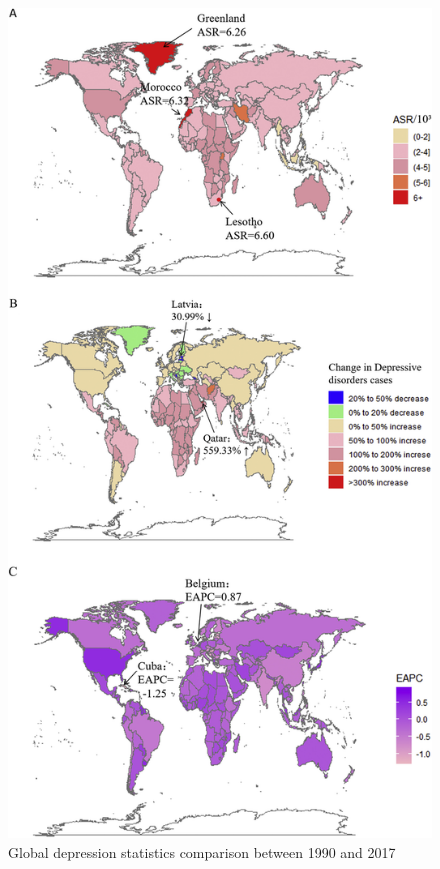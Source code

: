 \begin{figure}[htbp]
	\centering
		\includegraphics[scale=0.65]{./figures/depression-map-Liu-et-al-2020.jpg}
	\caption{Global depression statistics comparison between 1990 and 2017 \cite{liu2020changes}}
	\label{FigGloablDepression}
\end{figure}

